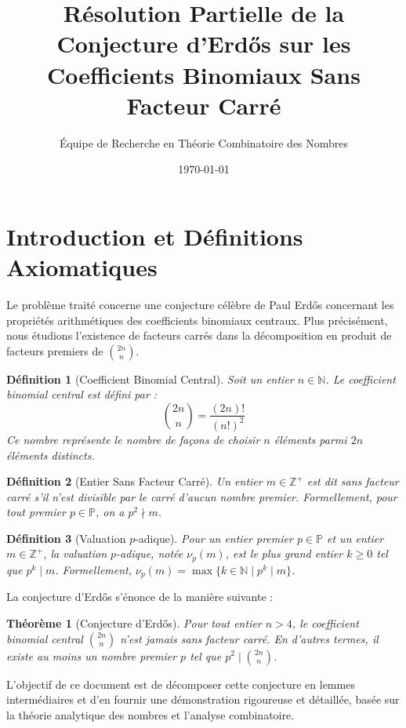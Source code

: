\documentclass[12pt,a4paper]{article}
\title{Résolution Partielle de la Conjecture d'Erd\H{o}s sur les Coefficients Binomiaux Sans Facteur Carré}
\author{Équipe de Recherche en Théorie Combinatoire des Nombres}
\date{\today}
\newtheorem{theorem}{Théorème}
\newtheorem{definition}{Définition}
\begin{document}
\maketitle
\tableofcontents
\newpage

\section{Introduction et Définitions Axiomatiques}
Le problème traité concerne une conjecture célèbre de Paul Erd\H{o}s concernant les propriétés arithmétiques des coefficients binomiaux centraux. Plus précisément, nous étudions l'existence de facteurs carrés dans la décomposition en produit de facteurs premiers de $\binom{2n}{n}$.

\begin{definition}[Coefficient Binomial Central]
Soit un entier $n \in \mathbb{N}$. Le coefficient binomial central est défini par :
\begin{equation}
\binom{2n}{n} = \frac{(2n)!}{(n!)^2}
\end{equation}
Ce nombre représente le nombre de façons de choisir $n$ éléments parmi $2n$ éléments distincts.
\end{definition}

\begin{definition}[Entier Sans Facteur Carré]
Un entier $m \in \mathbb{Z}^{+}$ est dit sans facteur carré s'il n'est divisible par le carré d'aucun nombre premier. Formellement, pour tout premier $p \in \mathbb{P}$, on a $p^2 \nmid m$.
\end{definition}

\begin{definition}[Valuation $p$-adique]
Pour un entier premier $p \in \mathbb{P}$ et un entier $m \in \mathbb{Z}^{+}$, la valuation $p$-adique, notée $\nu_p(m)$, est le plus grand entier $k \ge 0$ tel que $p^k \mid m$. Formellement, $\nu_p(m) = \max \{ k \in \mathbb{N} \mid p^k \mid m \}$.
\end{definition}

La conjecture d'Erd\H{o}s s'énonce de la manière suivante :
\begin{theorem}[Conjecture d'Erd\H{o}s]
Pour tout entier $n > 4$, le coefficient binomial central $\binom{2n}{n}$ n'est jamais sans facteur carré. En d'autres termes, il existe au moins un nombre premier $p$ tel que $p^2 \mid \binom{2n}{n}$.
\end{theorem}

L'objectif de ce document est de décomposer cette conjecture en lemmes intermédiaires et d'en fournir une démonstration rigoureuse et détaillée, basée sur la théorie analytique des nombres et l'analyse combinatoire.
\end{document}

